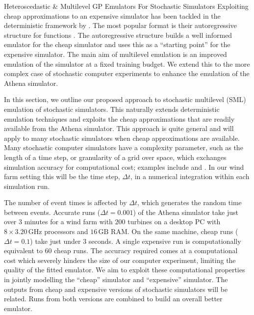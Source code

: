 \begin{chapter}{Heteroscedastic \& Multilevel GP Emulators For Stochastic Simulators\label{Ch:Hetsml}}
Exploiting cheap approximations to an expensive simulator has been tackled in the deterministic framework by \citet{Kennedy2000}. The most popular format is their autoregressive structure for functions \citep{Forrester2007, Singh2017, Harvey2018}. The autoregressive structure builds a well informed emulator for the cheap simulator and uses this as a ``starting point'' for the expensive simulator. The main aim of multilevel emulation is an improved emulation of the simulator at a fixed training budget. We extend this to the more complex case of stochastic computer experiments to enhance the emulation of the Athena simulator.


In this section, we outline our proposed approach to stochastic multilevel (SML) emulation of stochastic simulators. This naturally extends deterministic emulation techniques and exploits the cheap approximations that are readily available from the Athena simulator. This approach is quite general and will apply to many stochastic simulators when cheap approximations are available. Many stochastic computer simulators have a complexity parameter, such as the length of a time step, or granularity of a grid over space, which exchanges simulation accuracy for computational cost; examples include \cite{Kennedy2000} and \citet{Le2014}. In our wind farm setting this will be the time step, $\Delta t$, in a numerical integration within each simulation run.

 The number of event times is affected by $\Delta t$, which generates the random time between events. Accurate runs ($\Delta t = 0.001$) of the Athena simulator take just over $3$ minutes for a wind farm with $200$ turbines on a desktop PC with $8 \times 3.20 \,\text{GHz}$ processors and $16\,\text{GB}$ RAM. On the same machine, cheap runs ($\Delta t = 0.1$) take just under $3$ seconds. A single expensive run is computationally equivalent to $60$ cheap runs. The accuracy required comes at a computational cost which severely hinders the size of our computer experiment, limiting the quality of the fitted emulator. We aim to exploit these computational properties in jointly modelling the ``cheap'' simulator and ``expensive'' simulator. The outputs from cheap and expensive versions of stochastic simulators will be related. Runs from both versions are combined to build an overall better emulator.


\end{chapter}
